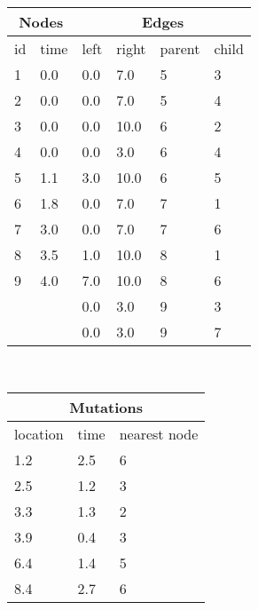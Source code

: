 
{\tiny
\begin{tabularx}{.8\textwidth}{p{0.2cm}p{0.4cm}|p{0.4cm}p{0.4cm}p{0.4cm}X}
\toprule
\multicolumn{2}{c}{\bf Nodes} & \multicolumn{4}{c}{\bf Edges} \\
\midrule
id & time &
left & right & parent & child \\
\midrule
1 & 0.0 &
0.0 & 7.0 & 5 & 3 \\
2 & 0.0 &
0.0 & 7.0 & 5 & 4 \\
3 & 0.0 &
0.0 & 10.0 & 6 & 2 \\
4 & 0.0 &
0.0 & 3.0 & 6 & 4 \\
5 & 1.1 &
3.0 & 10.0 & 6 & 5 \\
6 & 1.8 &
0.0 & 7.0 & 7 & 1 \\
7 & 3.0 &
0.0 & 7.0 & 7 & 6 \\
8 & 3.5 &
1.0 & 10.0 & 8 & 1 \\
9 & 4.0 &
7.0 & 10.0 & 8 & 6 \\
& & 
0.0 & 3.0 & 9 & 3 \\
& & 
0.0 & 3.0 & 9 & 7 \\
\end{tabularx}
}\\
{\tiny
\begin{tabularx}{.8\textwidth}{p{.7cm}p{.5cm}X}
\toprule
\multicolumn{3}{c}{\bf Mutations}\\
\midrule
location & time & nearest node\\
\midrule
1.2 & 2.5 & 6 \\
2.5 & 1.2 & 3\\
3.3 & 1.3 & 2\\
3.9 & 0.4 & 3\\
6.4 & 1.4 & 5\\
8.4 & 2.7 & 6 \\
\bottomrule
\end{tabularx}
}


